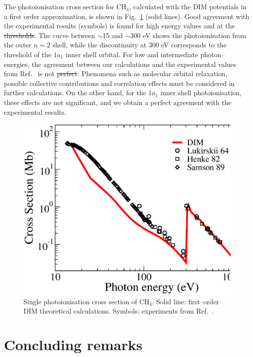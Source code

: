 \documentclass[10pt]{article}
\providecommand{\DIFaddtex}[1]{{\protect\color{blue}\uwave{#1}}} %
\providecommand{\DIFdeltex}[1]{{\protect\color{red}\sout{#1}}}                      %
\providecommand{\DIFaddbegin}{} %
\providecommand{\DIFaddend}{} %
\providecommand{\DIFdelbegin}{} %
\providecommand{\DIFdelend}{} %
\providecommand{\DIFadd}[1]{\texorpdfstring{\DIFaddtex{#1}}{#1}} %
\providecommand{\DIFdel}[1]{\texorpdfstring{\DIFdeltex{#1}}{}} %
\begin{document}
The photoionisation cross section for CH$_4$, calculated with the DIM 
potentials in a first order approximation, is shown in 
Fig.~\ref{fig:photoch4} (solid lines). Good agreement with the 
experimental results (symbols) is found for high energy values and at 
the \DIFdelbegin \DIFdel{thresholds}\DIFdelend \DIFaddbegin \DIFadd{threshold}\DIFaddend . The curve between $\sim$15 and $\sim$300 eV shows the 
photoionisation from the outer $n=2$ shell, while the discontinuity 
at 300 eV corresponds to the threshold of the $1a_1$ inner shell 
orbital. For low and intermediate photon--energies, the agreement 
between our calculations and the experimental values from 
Ref.~\cite{Lukirskii1964,Henke1982,Samson1989} is not \DIFdelbegin \DIFdel{perfect}\DIFdelend \DIFaddbegin \DIFadd{that good}\DIFaddend . 
Phenomena such as molecular orbital relaxation, possible collective 
contributions and correlation effects must be considered in further 
calculations. On the other hand, for the $1a_1$ inner shell
photoionisation, these effects are not significant, and we obtain a 
perfect agreement with the experimental results.
\begin{figure}[H]
\centering
\includegraphics[height=0.23\textheight]{figures/dimpot/photoch4.eps}
\caption{Single photoionisation cross section of CH$_4$.
Solid line: first--order DIM theoretical calculations. Symbols: experiments
from Ref.~\cite{Lukirskii1964,Henke1982,Samson1989}.}
\label{fig:photoch4}
\end{figure}


\section{Concluding remarks}
\end{document}
